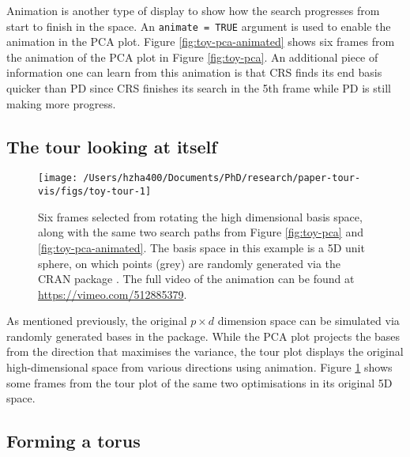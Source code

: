 Animation is another type of display to show how the search progresses
from start to finish in the space. An \texttt{animate\ =\ TRUE} argument
is used to enable the animation in the PCA plot. Figure
\ref{fig:toy-pca-animated} shows six frames from the animation of the
PCA plot in Figure \ref{fig:toy-pca}. An additional piece of information
one can learn from this animation is that CRS finds its end basis
quicker than PD since CRS finishes its search in the 5th frame while PD
is still making more progress.

\hypertarget{the-tour-looking-at-itself}{%
\subsection{The tour looking at
itself}\label{the-tour-looking-at-itself}}

\begin{Schunk}
\begin{figure}

{\centering \texttt{[image: /Users/hzha400/Documents/PhD/research/paper-tour-vis/figs/toy-tour-1]} 

}

\caption{Six frames selected from rotating the high dimensional basis space, along with the same two search paths from Figure \ref{fig:toy-pca} and \ref{fig:toy-pca-animated}. The basis space in this example is a 5D unit sphere, on which points (grey) are randomly generated via the CRAN package . The full video of the animation can be found at \url{https://vimeo.com/512885379}.}\label{fig:toy-tour}
\end{figure}
\end{Schunk}

As mentioned previously, the original \(p \times d\) dimension space can
be simulated via randomly generated bases in the 
\citep{geozoo} package. While the PCA plot projects the bases from the
direction that maximises the variance, the tour plot displays the
original high-dimensional space from various directions using animation.
Figure \ref{fig:toy-tour} shows some frames from the tour plot of the
same two optimisations in its original 5D space.

\hypertarget{forming-a-torus}{%
\subsection{Forming a torus}\label{forming-a-torus}}

